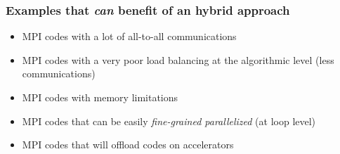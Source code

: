 \begin{frame}[fragile]
\frametitle{Examples that \textit{can} benefit of an hybrid approach}
\begin{itemize}
\item MPI codes with a lot of all-to-all communications
\item MPI codes with a very poor load balancing at the algorithmic level (less communications)
\item MPI codes with memory limitations
\item MPI codes that can be easily \textit{fine-grained parallelized} (at loop level)
\item MPI codes that will offload codes on accelerators
\end{itemize}

\end{frame}





